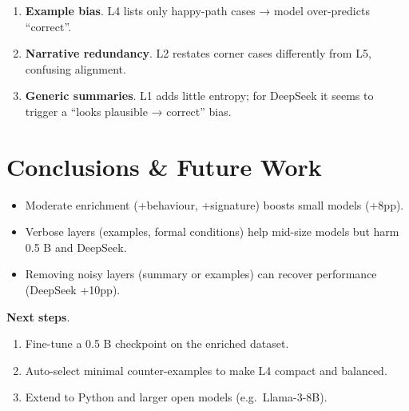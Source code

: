 \documentclass[a4paper]{usiinfbachelorproject}
\begin{document}
\begin{enumerate}[label=\alph*),leftmargin=15pt,itemsep=0pt]
  \item \textbf{Example bias}.  L4 lists only happy-path cases → model over-predicts “correct”.  
  \item \textbf{Narrative redundancy}.  L2 restates corner cases differently from L5, confusing alignment.  
  \item \textbf{Generic summaries}.  L1 adds little entropy; for DeepSeek it seems to trigger a “looks plausible → correct” bias.
\end{enumerate}

\section{Conclusions \& Future Work}\label{sec:concl}

\begin{itemize}[leftmargin=12pt]
  \item Moderate enrichment (+behaviour, +signature) boosts small models (+8pp).  
  \item Verbose layers (examples, formal conditions) help mid-size models but harm 0.5 B and DeepSeek.  
  \item Removing noisy layers (summary or examples) can recover performance (DeepSeek +10pp).  
\end{itemize}

\textbf{Next steps}.  
\begin{enumerate}[label=\arabic*.]
  \item Fine-tune a 0.5 B checkpoint on the enriched dataset.  
  \item Auto-select minimal counter-examples to make L4 compact and balanced.  
  \item Extend to Python and larger open models (e.g.\ Llama-3-8B).  
\end{enumerate}



\end{document}
